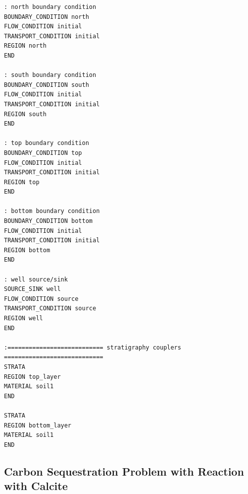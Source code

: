 \documentclass[12pt]{article}
\begin{document}
\begin{verbatim}
: north boundary condition
BOUNDARY_CONDITION north
FLOW_CONDITION initial
TRANSPORT_CONDITION initial
REGION north
END

: south boundary condition
BOUNDARY_CONDITION south
FLOW_CONDITION initial
TRANSPORT_CONDITION initial
REGION south
END

: top boundary condition
BOUNDARY_CONDITION top
FLOW_CONDITION initial
TRANSPORT_CONDITION initial
REGION top
END

: bottom boundary condition
BOUNDARY_CONDITION bottom
FLOW_CONDITION initial
TRANSPORT_CONDITION initial
REGION bottom
END

: well source/sink
SOURCE_SINK well
FLOW_CONDITION source
TRANSPORT_CONDITION source
REGION well
END

:=========================== stratigraphy couplers ============================
STRATA
REGION top_layer
MATERIAL soil1
END

STRATA
REGION bottom_layer
MATERIAL soil1
END

\end{verbatim}

\normalsize

\subsection{Carbon Sequestration Problem with Reaction with Calcite}
\end{document}
